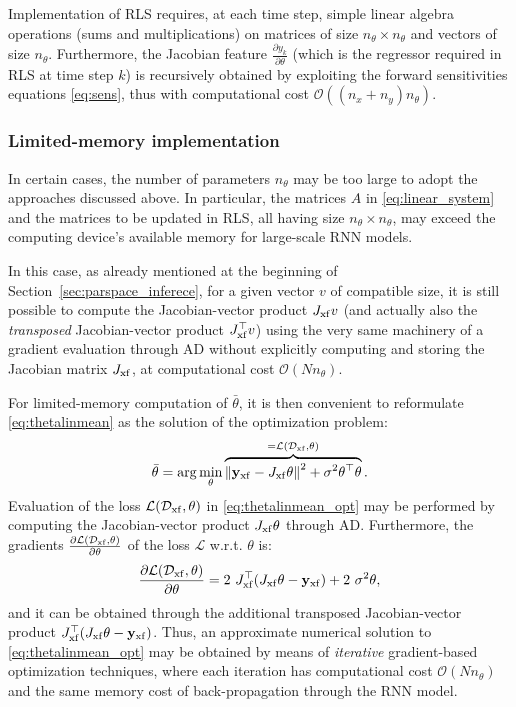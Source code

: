 \documentclass{article}
\newcommand{\nsamp}{{N}}
\newcommand{\npar}{{n_\theta}}
\newcommand{\nx}{{n_x}}
\newcommand{\D}{\mathcal{D}}
\newcommand{\transf}{{\rm{xf}}}
\newcommand{\norm}[1]{\left\lVert#1\right\rVert}
\newcommand{\tvec}[1]{{\mathbf{#1}}}
\begin{document}
Implementation of RLS requires, at each time step, simple linear algebra operations
(sums and multiplications) 
on matrices of size $\npar \times \npar$ and vectors of size $\npar$. Furthermore, the Jacobian feature $\frac{\partial y_k}{\partial \theta}$ (which is the regressor required in RLS at time step $k$)  is  recursively obtained by  exploiting the forward sensitivities equations  \eqref{eq:sens},  thus with computational cost $\mathcal{O}((\nx + n_y)\npar)$.

\subsubsection{Limited-memory implementation}
\label{sec:LM-BLR}
In certain cases, the number of parameters $\npar$ may be too large to adopt the approaches discussed above. 
In particular, the matrices $A$ in \eqref{eq:linear_system} and the matrices to be updated in RLS, all having size $\npar \times \npar$, may exceed the computing device's available memory for large-scale RNN  models. 

In this case, as already mentioned at the beginning   of Section~\ref{sec:parspace_inferece}, for a given vector $v$ of compatible size, it is still possible to compute the Jacobian-vector product  $J_\transf v$ (and actually also the \emph{transposed} Jacobian-vector product  $J_\transf^\top v$) using the very same machinery of a gradient evaluation through AD without explicitly computing and storing the Jacobian matrix $J_\transf$, at computational cost  $\mathcal{O}(\nsamp \npar)$.

For limited-memory computation of $\bar \theta$, it is then convenient to reformulate  \eqref{eq:thetalinmean} as the solution of the optimization problem:
\begin{equation}
    \label{eq:thetalinmean_opt}
    \bar{\theta} = \arg \min_{\theta} 
    \overbrace{\norm{\tvec{y}_\transf - J_\transf \theta}^2 + \sigma^2 \theta^\top \theta}^{=\mathcal{L}(\D_\transf, \theta)}.
\end{equation}
Evaluation of the loss $\mathcal{L}(\D_\transf, \theta)$ in \eqref{eq:thetalinmean_opt}  may be performed by computing the Jacobian-vector product $J_\transf \theta$ through AD.
Furthermore, the gradients $\frac{\partial \mathcal{L}(\D_\transf, \theta)}{\partial \theta}$ of the loss $\mathcal{L}$ w.r.t. $\theta$ is:
\begin{equation*}
\frac{\partial \mathcal{L}(\D_\transf, \theta)}{\partial \theta} = 2\ J_\transf^\top (J_\transf \theta - \tvec{y}_\transf) + 2\ \sigma^2\theta,
\end{equation*}
and it can be obtained through the additional transposed Jacobian-vector product $J_\transf^\top (J_\transf \theta - \tvec{y}_\transf)$.
Thus, an approximate numerical solution to \eqref{eq:thetalinmean_opt} may be obtained by means of \emph{iterative} gradient-based optimization techniques, where each iteration has computational cost $\mathcal{O}(\nsamp \npar)$ and the same memory cost of back-propagation through the RNN model. 
\end{document}
